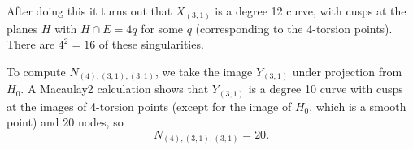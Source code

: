 \documentclass[11pt]{article}           %
\theoremstyle{definition}
\begin{document}
After doing this it turns out that $X_{(3,1)}$ is a degree 12 curve, with cusps at the planes $H$ with $H\cap E=4q$ for some $q$ (corresponding to the 4-torsion points). There are $4^2=16$ of these singularities.

To compute $N_{(4),(3,1),(3,1)}$, we take the image $Y_{(3,1)}$ under projection from $H_0$. A Macaulay2 calculation shows that $Y_{(3,1)}$ is a degree 10
curve with cusps at the images of 4-torsion points (except for the image of $H_0$, which is a smooth point) and $20$ nodes, so
\[
N_{(4),(3,1),(3,1)}=20.
\]





\printbibliography[heading=bibintoc, title={References}]
\end{document}
